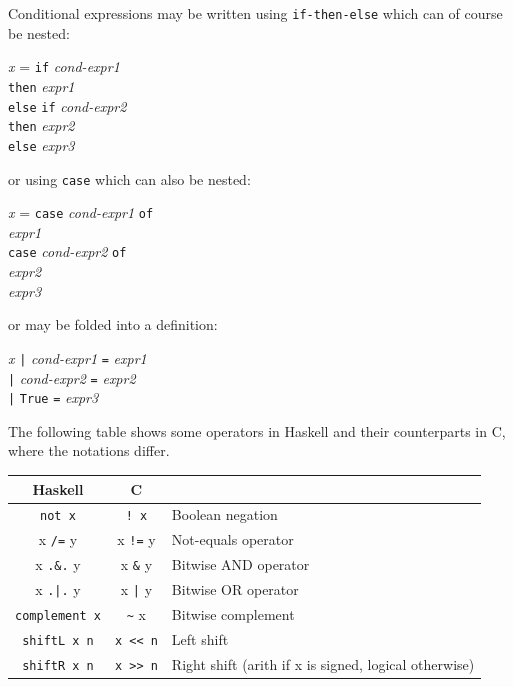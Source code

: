 \documentclass[11pt]{article}
\newcommand{\hmm}{\hspace*{2em}}
\newcommand{\hmmm}{\hspace*{3em}}
\begin{document}
Conditional expressions may be written using \verb|if-then-else| which can of course be nested:
\begin{tabbing}
\hmmm \= \emph{x} = \= {\tt if} \emph{cond-expr1} \\
      \>            \> {\tt then} \emph{expr1} \\
      \>            \> {\tt else} \= {\tt if} \emph{cond-expr2} \\
      \>            \>            \> {\tt then} \emph{expr2} \\
      \>            \>            \> {\tt else} \emph{expr3}
\end{tabbing}
or using \verb|case| which can also be nested:
\begin{tabbing}
\hmmm \= \emph{x} = \= {\tt case} \emph{cond-expr1} {\tt of}\\
      \>            \> \hmm {\tt True -> } \emph{expr1} \\
      \>            \> \hmm {\tt False ->} \= {\tt case} \emph{cond-expr2} {\tt of}\\
      \>            \>                     \> \hmm {\tt True ->} \emph{expr2} \\
      \>            \>                     \> \hmm {\tt False ->} \emph{expr3}
\end{tabbing}
or may be folded into a definition:
\begin{tabbing}
\hmmm \= \emph{x} \= {\tt |} \emph{cond-expr1} \= {\tt =} \emph{expr1} \\
      \>          \> {\tt |} \emph{cond-expr2} \> {\tt =} \emph{expr2} \\
      \>          \> {\tt |} {\tt True}        \> {\tt =} \emph{expr3}
\end{tabbing}

The following table shows some operators in Haskell and their
counterparts in C, where the notations differ.

\begin{tabular}{|c|c|l|}
\hline
Haskell           & C             & \\
\hline
\verb|not x|        & \verb|! x|    & Boolean negation \\
x \verb|/=| y       & x \verb|!=| y & Not-equals operator \\
x \verb|.&.| y      & x \verb|&| y  & Bitwise AND operator \\
x \verb/.|./ y      & x \verb/|/ y  & Bitwise OR operator \\
\verb|complement x| & \verb|~| x    & Bitwise complement \\
\verb|shiftL x n|   & \verb|x << n| & Left shift  \\
\verb|shiftR x n|   & \verb|x >> n| & Right shift (arith if x is signed, logical otherwise) \\
\hline
\end{tabular}
\end{document}
